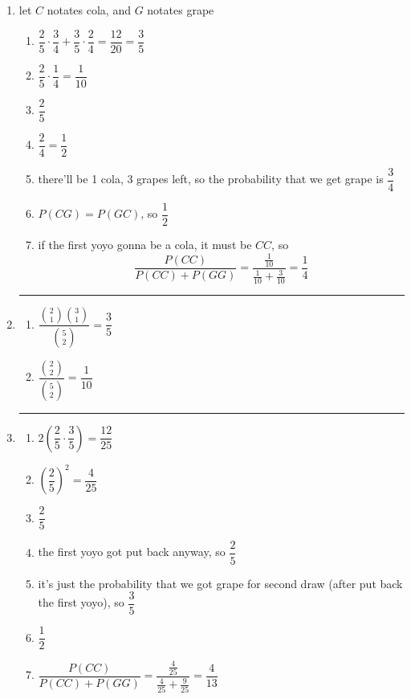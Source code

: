 \medskip
\solution

\begin{enumerate}
    \item let $C$ notates cola, and $G$ notates grape
    \begin{enumerate}
        \item $\dfrac{2}{5}\cdot\dfrac{3}{4} + \dfrac{3}{5}\cdot\dfrac{2}{4} = \dfrac{12}{20} = \boxed{\dfrac{3}{5}}$
        \item $\dfrac{2}{5}\cdot\dfrac{1}{4} = \boxed{\dfrac{1}{10}}$
        \item $\boxed{\dfrac{2}{5}}$
        \item $\dfrac{2}{4} = \boxed{\dfrac{1}{2}}$
        \item there'll be 1 cola, 3 grapes left, so the probability that we get grape is $\boxed{\dfrac{3}{4}}$
        \item $P(CG) = P(GC)$, so $\boxed{\dfrac{1}{2}}$
        \item if the first yoyo gonna be a cola, it must be $CC$, so
            \[\dfrac{P(CC)}{P(CC)+P(GG)} = \dfrac{\frac{1}{10}}{\frac{1}{10}+\frac{3}{10}} = \boxed{\dfrac{1}{4}}\]
    \end{enumerate}

    \medskip
    \begin{center}
    \rule{0.3\linewidth}{0.2pt}
    \end{center}
    \medskip

    \item
    \begin{enumerate}
        \item $\dfrac{\binom{2}{1}\binom{3}{1}}{\binom{5}{2}} = \boxed{\dfrac{3}{5}}$
        \item $\dfrac{\binom{2}{2}}{\binom{5}{2}} = \boxed{\dfrac{1}{10}}$
    \end{enumerate}

    \medskip
    \begin{center}
    \rule{0.3\linewidth}{0.2pt}
    \end{center}
    \medskip

    \item 
    \begin{enumerate}
        \item $2\left(\dfrac{2}{5}\cdot\dfrac{3}{5} \right)= \boxed{\dfrac{12}{25}}$
        \item $\left(\dfrac{2}{5}\right)^2 = \boxed{\dfrac{4}{25}}$
        \item $\boxed{\dfrac{2}{5}}$
        \item the first yoyo got put back anyway, so $\boxed{\dfrac{2}{5}}$
        \item it's just the probability that we got grape for second draw (after put back the first yoyo), so $\boxed{\dfrac{3}{5}}$
        \item $\boxed{\dfrac{1}{2}}$
        \item $\dfrac{P(CC)}{P(CC)+P(GG)} = \dfrac{\frac{4}{25}}{\frac{4}{25}+\frac{9}{25}} = \boxed{\dfrac{4}{13}}$
    \end{enumerate}
\end{enumerate}

